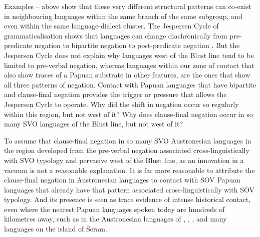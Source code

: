 Examples -- above show that these very different structural
patterns can co-exist in neighbouring languages within the same
branch of the same subgroup,
and even within the same language-dialect cluster.
The Jespersen Cycle of grammaticalisation shows that languages
can change diachronically from pre-predicate negation to bipartite
negation to post-predicate negation
\citep{Jespersen1917,Vossen2016,Fricke2017}.
But the Jespersen Cycle does not explain why languages west of
the Blust line tend to be limited to pre-verbal negation,
whereas languages within our zone of contact that also show traces
of a Papuan substrate in other features,
are the ones that show all three patterns of negation.
Contact with Papuan languages that have bipartite
and clause-final negation provides the trigger or pressure that
allows the Jespersen Cycle to operate.
Why did the shift in negation occur so regularly within this
region, but not west of it? Why does clause-final negation occur in so
many SVO languages  of the Blust line,
but not west of it?

To assume that clause-final negation in so many SVO Austronesian
languages in the region developed from the pre-verbal negation
associated cross-linguistically with SVO typology
and pervasive west of the Blust line,
as an innovation in a vacuum is not a reasonable explanation.
It is far more reasonable to attribute the clause-final negation
in Austronesian languages to contact with SOV Papuan languages
that already have that pattern associated cross-linguistically with SOV typology.
And its presence is seen as trace evidence of intense historical
contact, even where the nearest Papuan languages spoken today are hundreds
of kilometres away, such as in the Austronesian languages of ,
, , and many languages on the island of Seram.


